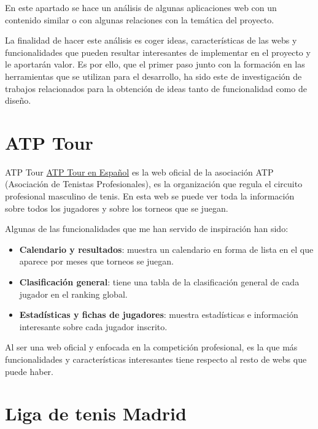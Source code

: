 

En este apartado se hace un análisis de algunas aplicaciones web con un contenido similar o con algunas relaciones con la temática del proyecto.

La finalidad de hacer este análisis es coger ideas, características de las webs y funcionalidades que pueden resultar interesantes de implementar en el proyecto y le aportarán valor. Es por ello, que el primer paso junto con la formación en las herramientas que se utilizan para el desarrollo, ha sido este de investigación de trabajos relacionados para la obtención de ideas tanto de funcionalidad como de diseño.

\section{ATP Tour}\label{atp-tour}

ATP Tour \href{https://www.atptour.com/es}{ATP Tour en Español} es la web oficial de la asociación ATP (Asociación de Tenistas Profesionales), es la organización que regula el circuito profesional masculino de tenis. En esta web se puede ver toda la información sobre todos los jugadores y sobre los torneos que se juegan.

Algunas de las funcionalidades que me han servido de inspiración han sido:
\begin{itemize}
    \item \textbf{Calendario y resultados}: muestra un calendario en forma de lista en el que aparece por meses que torneos se juegan.
    \item \textbf{Clasificación general}: tiene una tabla de la clasificación general de cada jugador en el ranking global.
    \item \textbf{Estadísticas y fichas de jugadores}: muestra estadísticas e información interesante sobre cada jugador inscrito.
\end{itemize}

Al ser una web oficial y enfocada en la competición profesional, es la que más funcionalidades y características interesantes tiene respecto al resto de webs que puede haber.


\section{Liga de tenis Madrid}\label{tenis-madrid}

